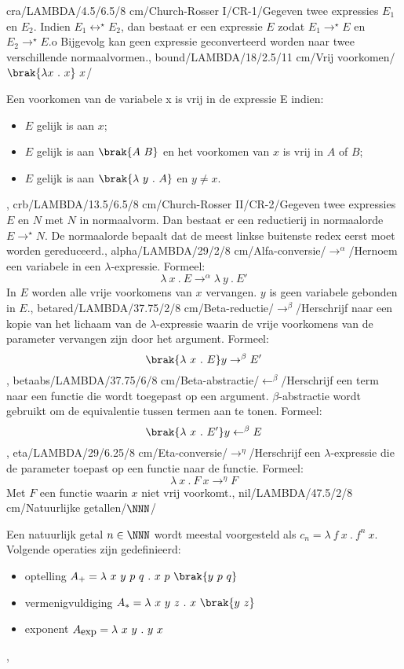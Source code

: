 cra/LAMBDA/4.5/6.5/8 cm/Church-Rosser I/CR-1/{Gegeven twee expressies $E_1$ en $E_2$. Indien $E_1\leftrightarrow^{\star}E_2$, dan bestaat er een expressie $E$ zodat $E_1\rightarrow^{\star}E$ en $E_2\rightarrow^{\star}E$.o Bijgevolg kan geen expressie geconverteerd worden naar twee verschillende normaalvormen.},
bound/LAMBDA/18/2.5/11 cm/Vrij voorkomen/$\brak{\lambda x\ .\ x}\ x$/{Een voorkomen van de variabele x is vrij in de expressie E indien:
\begin{itemize}\item $E$ gelijk is aan $x$;\item $E$ gelijk is aan $\brak{A\ B}$ en het voorkomen van $x$ is vrij in $A$ of $B$;\item $E$ gelijk is aan $\brak{\lambda\ y\ .\ A}$ en $y\neq x$.\end{itemize}},
crb/LAMBDA/13.5/6.5/8 cm/Church-Rosser II/CR-2/{Gegeven twee expressies $E$ en $N$ met $N$ in normaalvorm. Dan bestaat er een reductierij in normaalorde $E\rightarrow^{ \star}N$. De normaalorde bepaalt dat de meest linkse buitenste redex eerst moet worden gereduceerd.},
alpha/LAMBDA/29/2/8 cm/Alfa-conversie/$\rightarrow^{\alpha}$/{Hernoem een variabele in een $\lambda$-expressie. Formeel:\[\lambda\ x\ .\ E\rightarrow^{\alpha}\lambda\ y\ .\ E'\] In $E$ worden alle vrije voorkomens van $x$ vervangen. $y$ is geen variabele gebonden in $E$.},
betared/LAMBDA/37.75/2/8 cm/Beta-reductie/$\rightarrow^{\beta}$/{Herschrijf naar een kopie van het lichaam van de $\lambda$-expressie waarin de vrije voorkomens van de parameter vervangen zijn door het argument. Formeel:\[\brak{\lambda\ x\ .\ E} y\rightarrow^{\beta}E'\]},
betaabs/LAMBDA/37.75/6/8 cm/Beta-abstractie/$\leftarrow^{\beta}$/{Herschrijf een term naar een functie die wordt toegepast op een argument. $\beta$-abstractie wordt gebruikt om de equivalentie tussen termen aan te tonen. Formeel:\[\brak{\lambda\ x\ .\ E'} y\leftarrow^{\beta}E\]},
eta/LAMBDA/29/6.25/8 cm/Eta-conversie/$\rightarrow^{\eta}$/{Herschrijf een $\lambda$-expressie die de parameter toepast op een functie naar de functie. Formeel:\[\lambda\ x\ .\ F\ x\rightarrow^{\eta}F\]Met $F$ een functie waarin $x$ niet vrij voorkomt.},
nil/LAMBDA/47.5/2/8 cm/Natuurlijke getallen/$\NNN$/{Een natuurlijk getal $n\in\NNN$ wordt meestal voorgesteld als $c_n=\lambda\ f\ x\ .\ f^n\ x$. Volgende operaties zijn gedefinieerd:\begin{itemize}\item optelling $A_{+}=\lambda\ x\ y\ p\ q\ .\ x\ p\ \brak{y\ p\ q}$\item vermenigvuldiging $A_{*}=\lambda\ x\ y\ z\ .\ x\ \brak{y\ z}$\item exponent $A_{\mbox{\small exp}}=\lambda\ x\ y\ .\ y\ x$\end{itemize}},

